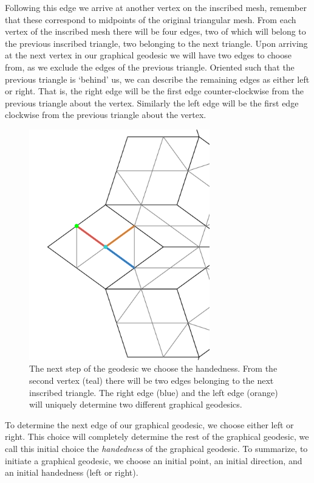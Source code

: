 \documentclass[
  oneside,
  11pt, a4paper,
  footinclude=true,
  headinclude=true,
  cleardoublepage=empty
]{scrbook}
\begin{document}
Following this edge we arrive at another vertex on the inscribed mesh, remember that these correspond to midpoints of the original triangular mesh. From each vertex of the inscribed mesh there will be four edges, two of which will belong to the previous inscribed triangle, two belonging to the next triangle. Upon arriving at the next vertex in our graphical geodesic we will have two edges to choose from, as we exclude the edges of the previous triangle. Oriented such that the previous triangle is `behind' us, we can describe the remaining edges as either left or right. That is, the right edge will be the first edge counter-clockwise from the previous triangle about the vertex. Similarly the left edge will be the first edge clockwise from the previous triangle about the vertex.
\begin{figure}[H]
\centering
\includegraphics[width=0.7\textwidth]{NextStep}
\caption[Next Step of Geodesic]{The next step of the geodesic we choose the handedness. From the second vertex (teal) there will be two edges belonging to the next inscribed triangle. The right edge (blue) and the left edge (orange) will uniquely determine two different graphical geodesics.}
\label{fig:nextstep}
\end{figure}
To determine the next edge of our graphical geodesic, we choose either left or right. This choice will completely determine the rest of the graphical geodesic, we call this initial choice the \textit{handedness} of the graphical geodesic. To summarize, to initiate a graphical geodesic, we choose an initial point, an initial direction, and an initial handedness (left or right).
\end{document}
